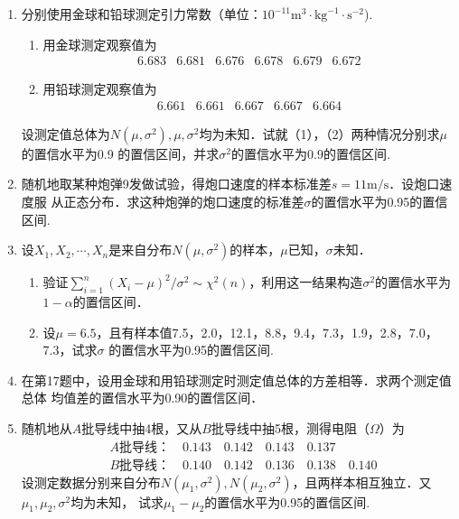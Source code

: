 \documentclass[10pt,a4paper]{article}
\begin{document}
\begin{enumerate}
    \item 分别使用金球和铅球测定引力常数（单位：$10^{-11}\mathrm{m}^3\cdot\mathrm{kg}^{-1}\cdot\mathrm{s}^{-2}$).
    \begin{enumerate}
        \item 用金球测定观察值为
        $$\begin{array}{cccccc}
            6.683 & 6.681 & 6.676 & 6.678 & 6.679 & 6.672
        \end{array}$$
        \item 用铅球测定观察值为
        $$\begin{array}{ccccc}
            6.661 & 6.661 & 6.667 & 6.667 & 6.664 
        \end{array}$$
    \end{enumerate}
    设测定值总体为$N(\mu,\sigma^2),\mu,\sigma^2$均为未知．试就（1），（2）两种情况分别求$\mu$的置信水平为0.9
    的置信区间，并求$\sigma^2$的置信水平为0.9的置信区间.
    \clearpage



    \item 随机地取某种炮弹9发做试验，得炮口速度的样本标准差$s=11\mathrm{m}/\mathrm{s}$．设炮口速度服
    从正态分布．求这种炮弹的炮口速度的标准差$\sigma$的置信水平为0.95的置信区间.
    \clearpage



    \item 设$X_1,X_2,\cdots,X_n$是来自分布$N(\mu,\sigma^2)$的样本，$\mu$已知，$\sigma$未知．
    \begin{enumerate}
        \item 验证$\displaystyle{\sum_{i=1}^n (X_i-\mu)^2/\sigma^2}\sim \chi^2(n)$，利用这一结果构造$\sigma^2$的置信水平为$1-\alpha$的置信区间．
        \item 设$\mu=6.5$，且有样本值7.5，2.0，12.1，8.8，9.4，7.3，1.9，2.8，7.0，7.3，试求$\sigma$
        的置信水平为0.95的置信区间.
    \end{enumerate}
    \clearpage


    \item 在第17题中，设用金球和用铅球测定时测定值总体的方差相等．求两个测定值总体
    均值差的置信水平为0.90的置信区间．
    \clearpage



    \item 随机地从$A$批导线中抽4根，又从$B$批导线中抽5根，测得电阻（$\Omega$）为
    \begin{equation}
        \begin{split}
            & A\mbox{批导线：} \quad  0.143 \quad 0.142 \quad 0.143 \quad 0.137\\
            & B\mbox{批导线：} \quad  0.140 \quad 0.142 \quad 0.136 \quad 0.138 \quad 0.140
        \end{split}
        \nonumber
    \end{equation}
    设测定数据分别来自分布$N(\mu_1,\sigma^2),N(\mu_2,\sigma^2)$，且两样本相互独立．又$\mu_1,\mu_2,\sigma^2$均为未知，
    试求$\mu_1-\mu_2$的置信水平为0.95的置信区间.
    \clearpage




\end{enumerate}
\end{document}

